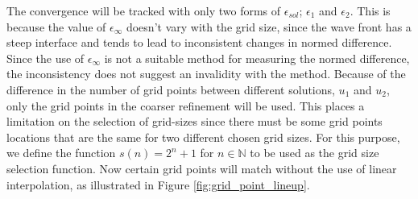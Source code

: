   The convergence will be tracked with only two forms of $\epsilon_{sol}$; $\epsilon_1$ and $\epsilon_2$.
  This is because the value of $\epsilon_{\infty}$ doesn't vary with the grid size, since the wave front has a steep interface and tends to lead to inconsistent changes in normed difference.
  Since the use of $\epsilon_{\infty}$ is not a suitable method for measuring the normed difference, the inconsistency does not suggest an invalidity with the method.
  Because of the difference in the number of grid points between different solutions, $u_1$ and $u_2$, only the grid points in the coarser refinement will be used.
  This places a limitation on the selection of grid-sizes since there must be some grid points locations that are the same for two different chosen grid sizes.
  For this purpose, we define the function $s(n) = 2^{n}+1$ for $n \in \mathbb{N}$ to be used as the grid size selection function.
  Now certain grid points will match without the use of linear interpolation, as illustrated in Figure \ref{fig:grid_point_lineup}.


